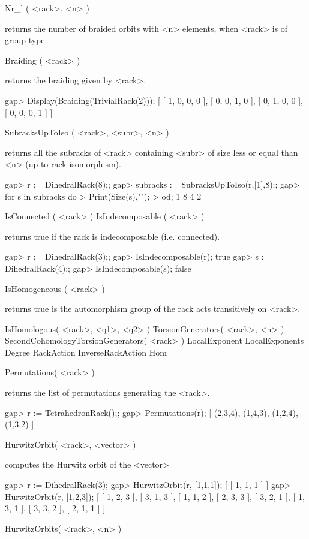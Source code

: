 \>Nr_l ( <rack>, <n> )

returns the number of braided orbits with <n> elements, when <rack> is of
group-type.

\>Braiding ( <rack> )

returns the braiding given by <rack>.

\beginexample
gap> Display(Braiding(TrivialRack(2)));  
[ [  1,  0,  0,  0 ],
  [  0,  0,  1,  0 ],
  [  0,  1,  0,  0 ],
  [  0,  0,  0,  1 ] ]
\endexample

\>SubracksUpToIso ( <rack>, <subr>, <n> )

returns all the subracks of <rack> containing <subr> of size less or equal than
<n> (up to rack isomorphism).

\beginexample
gap> r := DihedralRack(8);;
gap> subracks := SubracksUpToIso(r,[1],8);;
gap> for s in subracks do
> Print(Size(s),"\n");
> od;
1
8
4
2
\endexample

\>IsConnected ( <rack> )
\>IsIndecomposable ( <rack> )

returns true if the rack is indecomposable (i.e. connected).

\beginexample
gap> r := DihedralRack(3);;
gap> IsIndecomposable(r);
true
gap> s := DihedralRack(4);;
gap> IsIndecomposable(s);
false
\endexample

\>IsHomogeneous ( <rack> )

returns true is the automorphism group of the rack acts transitively on <rack>.

\>IsHomologous( <rack>, <q1>, <q2> )
\>TorsionGenerators( <rack>, <n> )
\>SecondCohomologyTorsionGenerators( <rack> )
\>LocalExponent
\>LocalExponents
\>Degree
\>RackAction
\>InverseRackAction
\>Hom

\>Permutations( <rack> )

returns the list of permutations generating the <rack>.

\beginexample
gap> r := TetrahedronRack();;
gap> Permutations(r);
[ (2,3,4), (1,4,3), (1,2,4), (1,3,2) ]
\endexample

\>HurwitzOrbit( <rack>, <vector> )

computes the Hurwitz orbit of the <vector>

\beginexample
gap> r := DihedralRack(3);   
gap> HurwitzOrbit(r, [1,1,1]); 
[ [ 1, 1, 1 ] ]
gap> HurwitzOrbit(r, [1,2,3]);
[ [ 1, 2, 3 ], [ 3, 1, 3 ], [ 1, 1, 2 ], [ 2, 3, 3 ], [ 3, 2, 1 ], [ 1, 3, 1 ], [ 3, 3, 2 ], [ 2, 1, 1 ] ]
\endexample 

\>HurwitzOrbits( <rack>, <n> )

